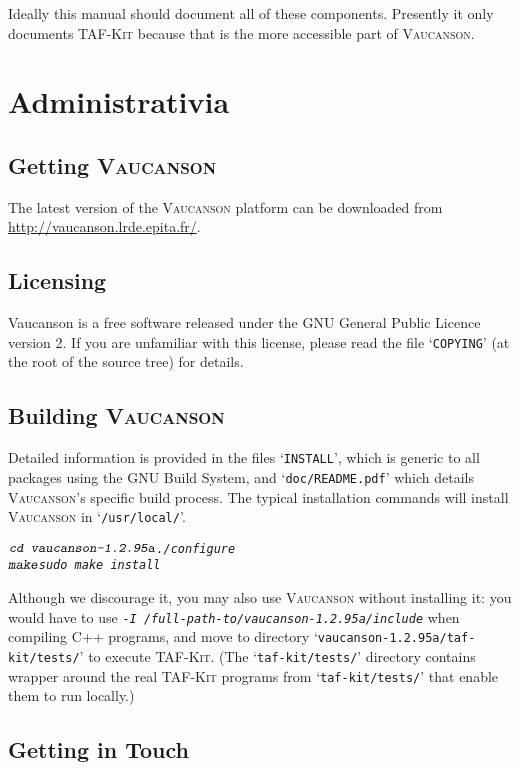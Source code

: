 \documentclass[a4paper]{report}
\newenvironment{shell}
{\begin{alltt}}
{\end{alltt}}
\def\VcsnVersion{1.2.95a}
\newcommand\kbd[1]{\textsl{\texttt{#1}}}
\newcommand\file[1]{`\texttt{#1}'}
\newcommand{\tafkit}{\textsc{TAF-Kit}\xspace}
\newcommand{\Vauc}{\textsc{Vaucanson}\xspace}
\begin{document}
Ideally this manual should document all of these components.
Presently it only documents \tafkit because that is the more
accessible part of \Vauc.


\chapter{Administrativia}

\section{Getting \Vauc}

The latest version of the \Vauc platform can be downloaded from
\url{http://vaucanson.lrde.epita.fr/}.

\section{Licensing}

Vaucanson is a free software released under the GNU General Public
Licence version 2. If you are unfamiliar with this license, please
read the file \file{COPYING} (at the root of the source tree) for
details.

\section{Building \Vauc}

Detailed information is provided in the files \file{INSTALL}, which is
generic to all packages using the GNU Build System, and
\file{doc/README.pdf} which details \Vauc's specific build process.
The typical installation commands will install \Vauc in
\file{/usr/local/}.

\begin{shell}
$ \kbd{cd vaucanson-\VcsnVersion}
$ \kbd{./configure}
$ \kbd{make}
$ \kbd{sudo make install}
\end{shell}

Although we discourage it, you may also use \Vauc without installing
it: you would have to use \kbd{-I
  /full-path-to/vaucanson-\VcsnVersion/include} when compiling C++
programs, and move to directory
\file{vaucanson-\VcsnVersion/taf-kit/tests/} to execute \tafkit.  (The
\file{taf-kit/tests/} directory contains wrapper around the real
\tafkit programs from \file{taf-kit/tests/} that enable them to run
locally.)

\section{Getting in Touch}
\end{document}
